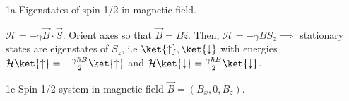 \documentclass[12pt]{article}
\newcommand{\HH}{\mathcal{H}}
\begin{document}
\begin{exc}{1a}
    Eigenstates of spin-1/2 in magnetic field. 
\end{exc}
\begin{ans}
    $\HH = -\gamma \vec B \cdot \vec S$. Orient axes so that $\vec B = B \hat z$. Then, $\HH = -\gamma BS_z \implies$ stationary states are eigenstates of $S_z$, i.e $\ket{\uparrow}, \ket{\downarrow}$ with energies $\HH \ket{\uparrow} = -\frac{\gamma \hbar B}{2}\ket{\uparrow}$ and $\HH \ket{\downarrow} = \frac{\gamma \hbar B}{2}\ket{\downarrow}$.
\end{ans}



\begin{exc}{1c}
    Spin 1/2 system in magnetic field $\vec B = (B_x, 0, B_z)$. 
\end{exc}
\end{document}
